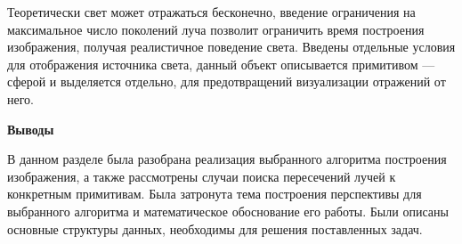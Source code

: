 Теоретически свет может отражаться бесконечно, введение ограничения на максимальное число поколений луча позволит ограничить время построения изображения,
получая  реалистичное поведение света. Введены отдельные условия для отображения источника света, данный объект описывается примитивом --- сферой и выделяется отдельно,
для предотвращений визуализации отражений от него.












\textbf{Выводы}

В данном разделе была разобрана реализация выбранного алгоритма построения изображения, а также рассмотрены случаи поиска пересечений лучей  к конкретным примитивам. 
Была затронута тема построения перспективы для выбранного алгоритма и математическое обоснование его работы. Были описаны основные структуры данных, необходимы для решения поставленных задач.





